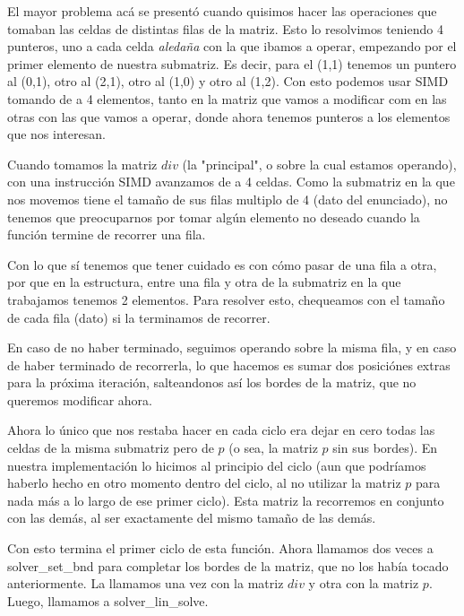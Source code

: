 El mayor problema acá se presentó cuando quisimos hacer las operaciones que tomaban las celdas de distintas filas de la matriz.
Esto lo resolvimos teniendo 4 punteros, uno a cada celda \textit{aledaña} con la que ibamos a operar, empezando por el primer elemento de nuestra submatriz. Es decir, para el (1,1) tenemos un puntero al (0,1), otro al (2,1), otro al (1,0) y otro al (1,2).
Con esto podemos usar SIMD tomando de a 4 elementos, tanto en la matriz que vamos a modificar com en las otras con las que vamos a operar, donde ahora tenemos punteros a los elementos que nos interesan.
\newline

\par Cuando tomamos la matriz $div$ (la "principal", o sobre la cual estamos operando), con una instrucción SIMD avanzamos de a 4 celdas. Como la submatriz en la que nos movemos tiene el tamaño de sus filas multiplo de 4 (dato del enunciado), no tenemos que preocuparnos por tomar algún elemento no deseado cuando la función termine de recorrer una fila.

Con lo que sí tenemos que tener cuidado es con cómo pasar de una fila a otra, por que en la estructura, entre una fila y otra de la submatriz en la que trabajamos tenemos 2 elementos.
Para resolver esto, chequeamos con el tamaño de cada fila (dato) si la terminamos de recorrer.

En caso de no haber terminado, seguimos operando sobre la misma fila, y en caso de haber terminado de recorrerla, lo que hacemos es sumar dos posiciónes extras para la próxima iteración, salteandonos así los bordes de la matriz, que no queremos modificar ahora.\newline

\par Ahora lo único que nos restaba hacer en cada ciclo era dejar en cero todas las celdas de la misma submatriz pero de $p$ (o sea, la matriz $p$ sin sus bordes). 
En nuestra implementación lo hicimos al principio del ciclo (aun que podríamos haberlo hecho en otro momento dentro del ciclo, al no  utilizar la matriz $p$ para nada más a lo largo de ese primer ciclo).
Esta matriz la recorremos en conjunto con las demás, al ser exactamente del mismo tamaño de las demás.
\newline

\par Con esto termina el primer ciclo de esta función. Ahora llamamos dos veces a solver\_set\_bnd para completar los bordes de la matriz, que no los había tocado anteriormente.
La llamamos una vez con la matriz $div$ y otra con la matriz $p$.
Luego, llamamos a solver\_lin\_solve.\newline


